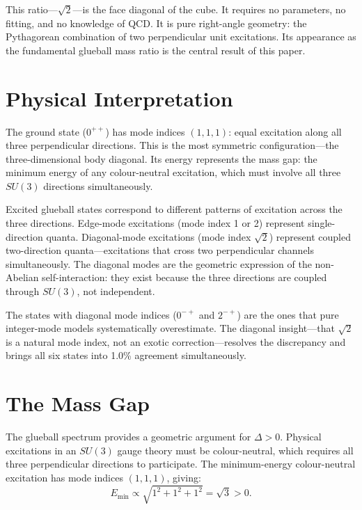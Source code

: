 \documentclass[aps,prd,twocolumn,superscriptaddress,nofootinbib]{revtex4-2}
\begin{document}
This ratio---$\sqrt{2}$---is the face diagonal of the cube. It
requires no parameters, no fitting, and no knowledge of QCD. It is
pure right-angle geometry: the Pythagorean combination of two
perpendicular unit excitations. Its appearance as the fundamental
glueball mass ratio is the central result of this paper.

\section{Physical Interpretation}
\label{sec:interpretation}

The ground state ($0^{++}$) has mode indices $(1,1,1)$: equal
excitation along all three perpendicular directions. This is the most
symmetric configuration---the three-dimensional body diagonal. Its
energy represents the mass gap: the minimum energy of any
colour-neutral excitation, which must involve all three $SU(3)$
directions simultaneously.

Excited glueball states correspond to different patterns of excitation
across the three directions. Edge-mode excitations (mode index 1 or 2)
represent single-direction quanta. Diagonal-mode excitations (mode
index $\sqrt{2}$) represent coupled two-direction quanta---excitations
that cross two perpendicular channels simultaneously. The diagonal
modes are the geometric expression of the non-Abelian
self-interaction: they exist because the three directions are coupled
through $SU(3)$, not independent.

The states with diagonal mode indices ($0^{-+}$ and $2^{-+}$) are
the ones that pure integer-mode models systematically overestimate.
The diagonal insight---that $\sqrt{2}$ is a natural mode index, not
an exotic correction---resolves the discrepancy and brings all six
states into 1.0\% agreement simultaneously.

\section{The Mass Gap}
\label{sec:massgap}

The glueball spectrum provides a geometric argument for $\Delta > 0$.
Physical excitations in an $SU(3)$ gauge theory must be
colour-neutral, which requires all three perpendicular directions to
participate. The minimum-energy colour-neutral excitation has mode
indices $(1,1,1)$, giving:
\begin{equation}
E_{\text{min}} \propto \sqrt{1^2 + 1^2 + 1^2} = \sqrt{3} > 0.
\label{eq:massgap}
\end{equation}
\end{document}
